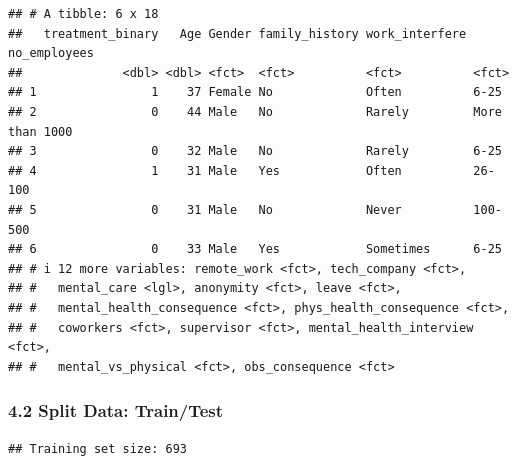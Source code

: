 \documentclass[
]{article}
\newenvironment{Shaded}{\begin{snugshade}}{\end{snugshade}}
\newcommand{\AttributeTok}[1]{\textcolor[rgb]{0.13,0.29,0.53}{#1}}
\newcommand{\ConstantTok}[1]{\textcolor[rgb]{0.56,0.35,0.01}{#1}}
\newcommand{\DecValTok}[1]{\textcolor[rgb]{0.00,0.00,0.81}{#1}}
\newcommand{\FloatTok}[1]{\textcolor[rgb]{0.00,0.00,0.81}{#1}}
\newcommand{\FunctionTok}[1]{\textcolor[rgb]{0.13,0.29,0.53}{\textbf{#1}}}
\newcommand{\NormalTok}[1]{#1}
\newcommand{\OtherTok}[1]{\textcolor[rgb]{0.56,0.35,0.01}{#1}}
\newcommand{\SpecialCharTok}[1]{\textcolor[rgb]{0.81,0.36,0.00}{\textbf{#1}}}
\newcommand{\StringTok}[1]{\textcolor[rgb]{0.31,0.60,0.02}{#1}}
\begin{document}
\begin{verbatim}
## # A tibble: 6 x 18
##   treatment_binary   Age Gender family_history work_interfere no_employees  
##              <dbl> <dbl> <fct>  <fct>          <fct>          <fct>         
## 1                1    37 Female No             Often          6-25          
## 2                0    44 Male   No             Rarely         More than 1000
## 3                0    32 Male   No             Rarely         6-25          
## 4                1    31 Male   Yes            Often          26-100        
## 5                0    31 Male   No             Never          100-500       
## 6                0    33 Male   Yes            Sometimes      6-25          
## # i 12 more variables: remote_work <fct>, tech_company <fct>,
## #   mental_care <lgl>, anonymity <fct>, leave <fct>,
## #   mental_health_consequence <fct>, phys_health_consequence <fct>,
## #   coworkers <fct>, supervisor <fct>, mental_health_interview <fct>,
## #   mental_vs_physical <fct>, obs_consequence <fct>
\end{verbatim}

\subsubsection{4.2 Split Data: Train/Test}\label{split-data-traintest}

\begin{Shaded}
\end{Shaded}

\begin{verbatim}
## Training set size: 693
\end{verbatim}
\end{document}
